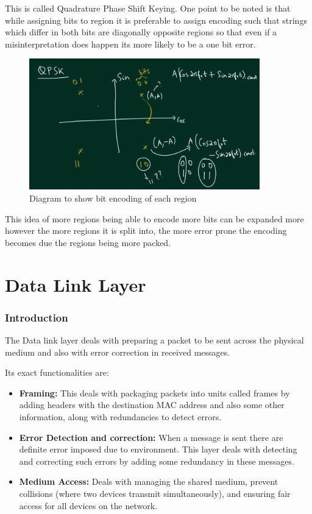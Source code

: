 \documentclass[12pt]{article}
\newcommand{\tbox}[1]{\noindent\fbox{\parbox{\textwidth}{#1}}}
\begin{document}
This is called Quadrature Phase Shift Keying. One point to be noted is that while 
assigning bits to region it is preferable to assign encoding such that strings which differ in both 
bits are diagonally opposite regions so that even if a misinterpretation does happen its more likely to be a one bit error. 

\begin{figure}
    \centering
    \includegraphics*[width = 10cm]{Diagrams/QPSK.png}
    \caption{Diagram to show bit encoding of each region }
\end{figure}

This idea of more regions being able to encode more bits can be expanded more however 
the more regions it is split into, the more error prone the encoding becomes due the regions being more packed. 
\newpage

\noindent\tbox{
    \begin{center}
    \textbf{\Huge Lecture 10}
    \end{center}
}
\part{Data Link Layer}
\section{Introduction}
The Data link layer deals with preparing a packet to be sent across 
the physical medium and also with error correction in received messages. 

Its exact functionalities are:
\begin{itemize}
    \item \textbf{Framing:} This deals with packaging packets into units called frames by adding headers with the destination MAC address and also some other information, along with redundancies to detect errors. 
    \item \textbf{Error Detection and correction:} When a message is sent there are definite error imposed due to environment. This layer deals with detecting and correcting such errors by adding some redundancy in these messages. 
    \item \textbf{Medium Access:} Deals with managing the shared medium, prevent collisions (where two devices transmit simultaneously), and ensuring fair access for all devices on the network.
\end{itemize}
\end{document}
